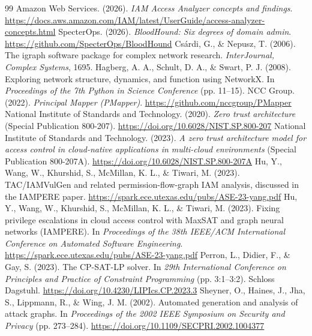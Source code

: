 \documentclass[10pt]{article}
\begin{document}
\clearpage
\begin{thebibliography}{99}
 Amazon Web Services. (2026). \textit{IAM Access Analyzer concepts and findings}. \url{https://docs.aws.amazon.com/IAM/latest/UserGuide/access-analyzer-concepts.html}
 SpecterOps. (2026). \textit{BloodHound: Six degrees of domain admin}. \url{https://github.com/SpecterOps/BloodHound}
 Csárdi, G., \& Nepusz, T. (2006). The igraph software package for complex network research. \textit{InterJournal, Complex Systems}, 1695.
 Hagberg, A. A., Schult, D. A., \& Swart, P. J. (2008). Exploring network structure, dynamics, and function using NetworkX. In \textit{Proceedings of the 7th Python in Science Conference} (pp. 11--15).
 NCC Group. (2022). \textit{Principal Mapper (PMapper)}. \url{https://github.com/nccgroup/PMapper}
 National Institute of Standards and Technology. (2020). \textit{Zero trust architecture} (Special Publication 800-207). \url{https://doi.org/10.6028/NIST.SP.800-207}
 National Institute of Standards and Technology. (2023). \textit{A zero trust architecture model for access control in cloud-native applications in multi-cloud environments} (Special Publication 800-207A). \url{https://doi.org/10.6028/NIST.SP.800-207A}
 Hu, Y., Wang, W., Khurshid, S., McMillan, K. L., \& Tiwari, M. (2023). TAC/IAMVulGen and related permission-flow-graph IAM analysis, discussed in the IAMPERE paper. \url{https://spark.ece.utexas.edu/pubs/ASE-23-yang.pdf}
 Hu, Y., Wang, W., Khurshid, S., McMillan, K. L., \& Tiwari, M. (2023). Fixing privilege escalations in cloud access control with MaxSAT and graph neural networks (IAMPERE). In \textit{Proceedings of the 38th IEEE/ACM International Conference on Automated Software Engineering}. \url{https://spark.ece.utexas.edu/pubs/ASE-23-yang.pdf}
 Perron, L., Didier, F., \& Gay, S. (2023). The CP-SAT-LP solver. In \textit{29th International Conference on Principles and Practice of Constraint Programming} (pp. 3:1--3:2). Schloss Dagstuhl. \url{https://doi.org/10.4230/LIPIcs.CP.2023.3}
 Sheyner, O., Haines, J., Jha, S., Lippmann, R., \& Wing, J. M. (2002). Automated generation and analysis of attack graphs. In \textit{Proceedings of the 2002 IEEE Symposium on Security and Privacy} (pp. 273--284). \url{https://doi.org/10.1109/SECPRI.2002.1004377}
\end{thebibliography}
\end{document}
